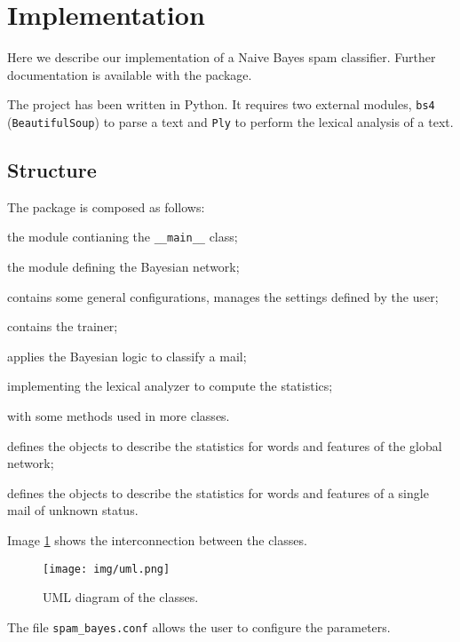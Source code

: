 \section{Implementation}
Here we describe our implementation of a Naive Bayes spam classifier. Further documentation is available with the package.

The project has been written in Python. It requires two external modules, \verb!bs4! (\verb!BeautifulSoup!) to parse a text and \verb!Ply! to perform the lexical analysis of a text.

\subsection{Structure}
The package is composed as follows:
\begin{description}[noitemsep]
  \item[spam\_bayes] the module contianing the \verb!__main__! class;
  \item[naive\_bayes] the module defining the Bayesian network;
  \item[config] contains some general configurations, manages the settings defined by the user;
  \item[trainer] contains the trainer;
  \item[classifier] applies the Bayesian logic to classify a mail;
  \item[lexer] implementing the lexical analyzer to compute the statistics;
  \item[utils] with some methods used in more classes.
  \item[gen\_stat] defines the objects to describe the statistics for words and features of the global network;
  \item[test\_stat] defines the objects to describe the statistics for words and features of a single mail of unknown status.
\end{description}

Image \ref{fig:uml} shows the interconnection between the classes.
\begin{figure}[h]
  \begin{center}
    \texttt{[image: img/uml.png]}
    \caption{UML diagram of the classes.}
    \label{fig:uml}
  \end{center}
\end{figure}

The file \verb!spam_bayes.conf! allows the user to configure the parameters.

